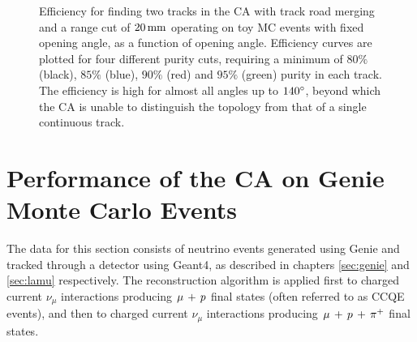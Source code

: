\begin{figure}
\centering
{}
\caption[Efficiency for finding 2 tracks for CA with merging and range cut operating on toy MC events]{\label{fig:ca_toy_rcut_twotrack_efficiency}Efficiency for finding two tracks in the \ac{CA} with track road merging and a range cut of $20\,\mathrm{mm}$ operating on toy MC events with fixed opening angle, as a function of opening angle. Efficiency curves are plotted for four different purity cuts, requiring a minimum of $80\%$ (black), $85\%$ (blue), $90\%$ (red) and $95\%$ (green) purity in each track. The efficiency is high for almost all angles up to $140^\circ$, beyond which the \ac{CA} is unable to distinguish the topology from that of a single continuous track.}
\end{figure}


\clearpage
\section{Performance of the \acl{CA} on Genie Monte Carlo Events}
The data for this section consists of neutrino events generated using Genie and tracked through a detector using Geant4, as described in chapters \ref{sec:genie} and \ref{sec:lamu} respectively. The reconstruction algorithm is applied first to charged current $\nu_\mu$ interactions producing $\mu\,+\,p$ final states (often referred to as \acl{CCQE} events), and then to charged current $\nu_\mu$ interactions producing $\mu\,+\,p\,+\,\pi^{+}$ final states.

